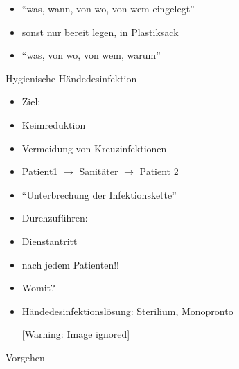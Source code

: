 \documentclass{article}
\begin{document}
\begin{itemize}
\item {\textquotedblleft}was, wann, von wo, von wem
eingelegt{\textquotedblright}

\end{itemize}
\begin{itemize}
\item sonst nur bereit legen, in Plastiksack

\end{itemize}
\begin{itemize}
\item {\textquotedblleft}was, von wo, von wem, warum{\textquotedblright}

\end{itemize}
Hygienische H\"andedesinfektion

\begin{itemize}
\item Ziel: 

\end{itemize}
\begin{itemize}
\item Keimreduktion

\end{itemize}
\begin{itemize}
\item Vermeidung von Kreuzinfektionen

\item Patient1 ${\rightarrow}$ Sanit\"ater ${\rightarrow}$ Patient 2

\item {\textquotedblleft}Unterbrechung der
Infektionskette{\textquotedblright}

\end{itemize}
\begin{itemize}
\item Durchzuf\"uhren:

\end{itemize}
\begin{itemize}
\item Dienstantritt

\item nach jedem Patienten!!

\end{itemize}
\begin{itemize}
\item Womit?

\end{itemize}
\begin{itemize}
\item H\"andedesinfektionsl\"osung: Sterilium, Monopronto

\begin{center}
 [Warning: Image ignored] %

\end{center}
\end{itemize}
Vorgehen 
\end{document}
